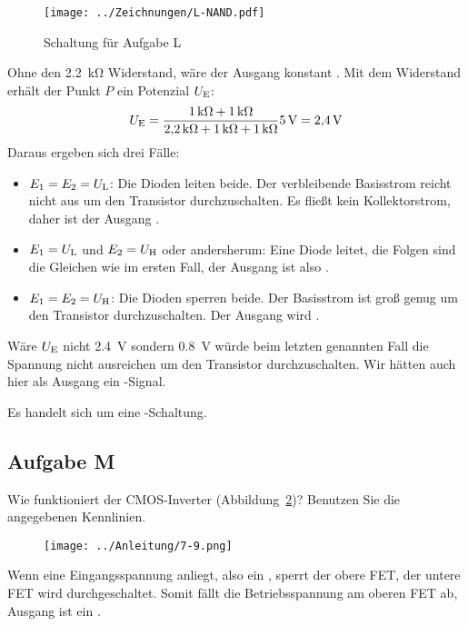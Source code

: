 \begin{figure}
    \centering
    \texttt{[image: ../Zeichnungen/L-NAND.pdf]}
    \caption{%
        Schaltung für Aufgabe L
    }
    \label{fig:L_NAND}
\end{figure}

Ohne den \SI{2.2}{\kilo\ohm} Widerstand, wäre der Ausgang konstant \thigh. Mit
dem Widerstand erhält der Punkt $P$ ein Potenzial $\UE$:
\[
    \UE = \frac {\SI{1}{\kilo\ohm} + \SI{1}{\kilo\ohm}} {\SI{2.2}{\kilo\ohm} +
    \SI{1}{\kilo\ohm} + \SI{1}{\kilo\ohm}}\SI 5{\volt} = \SI{2.4}{\volt}
\]
Daraus ergeben sich drei Fälle:
\begin{itemize}
    \item
        $E_1 = E_2 = \UL$: Die Dioden leiten beide. Der verbleibende Basisstrom
        reicht nicht aus um den Transistor durchzuschalten. Es fließt kein
        Kollektorstrom, daher ist der Ausgang \thigh.
    \item
        $E_1 = \UL$ und $E_2 = \UH$ oder andersherum: Eine Diode leitet, die
        Folgen sind die Gleichen wie im ersten Fall, der Ausgang ist also
        \thigh.
    \item
        $E_1 = E_2 = \UH$: Die Dioden sperren beide. Der Basisstrom ist groß
        genug um den Transistor durchzuschalten. Der Ausgang wird \tlow.
\end{itemize}
Wäre $\UE$ nicht \SI{2.4}{\volt} sondern \SI{0.8}{\volt} würde beim letzten
genannten Fall die Spannung nicht ausreichen um den Transistor durchzuschalten.
Wir hätten auch hier als Ausgang ein \thigh-Signal.

Es handelt sich um eine \tnand-Schaltung.

\FloatBarrier
\subsection{Aufgabe M}

\begin{problem}
	Wie funktioniert der CMOS-Inverter (Abbildung~\ref{fig:7-9})? Benutzen Sie
	die angegebenen Kennlinien.
\end{problem}

\begin{figure}[htbp]
	\centering
	\texttt{[image: ../Anleitung/7-9.png]}
	\caption{%
		\cite[Abbildung~7.9]{physik313-Anleitung}
	}
	\label{fig:7-9}
\end{figure}

Wenn eine Eingangsspannung anliegt, also ein \thigh, sperrt der obere FET, der
untere FET wird durchgeschaltet. Somit fällt die Betriebsspannung am oberen FET
ab, Ausgang ist ein \tlow.

